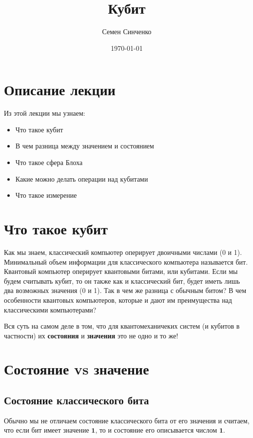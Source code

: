 \documentclass[11pt]{article}
\author{Семен Синченко}
\date{\today}
\title{Кубит}
\begin{document}
\maketitle
\tableofcontents


\section{Описание лекции}
\label{sec:org902b36f}
Из этой лекции мы узнаем:
\begin{itemize}
\item Что такое кубит
\item В чем разница между значением и состоянием
\item Что такое сфера Блоха
\item Какие можно делать операции над кубитами
\item Что такое измерение
\end{itemize}

\section{Что такое кубит}
\label{sec:org9682074}

Как мы знаем, классический компьютер оперирует двоичными числами (0 и 1). Минимальный объем информации для классического компьютера называется бит. Квантовый компьютер оперирует квантовыми битами, или кубитами. Если мы будем считывать кубит, то он также как и классический бит, будет иметь лишь два возможных значения (0 и 1). Так в чем же разница с обычным битом? В чем особенности квантовых компьютеров, которые и дают им преимущества над классическими компьютерами?

Вся суть на самом деле в том, что для квантомеханичеких систем (и кубитов в частности) их \textbf{состояния} и \textbf{значения} это не одно и то же!

\section{Состояние vs значение}
\label{sec:org8b4dd4c}

\subsection{Состояние классического бита}
\label{sec:org427ea79}
Обычно мы не отличаем состояние классического бита от его значения и считаем, что если бит имеет значение \(\mathbf{1}\), то и состояние его описывается числом \(\mathbf{1}\).
\end{document}
